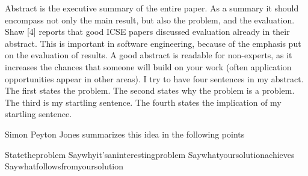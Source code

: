 Abstract is the executive summary of the entire paper. As a summary it should encompass not only the main result, but also the problem, and the evaluation. Shaw [4] reports that good ICSE papers discussed evaluation already in their abstract. This is important in software engineering, because of the emphasis put on the evaluation of results.
A good abstract is readable for non-experts, as it increases the chances that someone will build on your work (often application opportunities appear in other areas).
I try to have four sentences in my abstract. The first states the problem. The second states why the problem is a problem. The third is my startling sentence. The fourth states the implication of my startling sentence.

Simon Peyton Jones summarizes this idea in the following points

Statetheproblem
Saywhyit’saninterestingproblem 
Saywhatyoursolutionachieves
Saywhatfollowsfromyoursolution